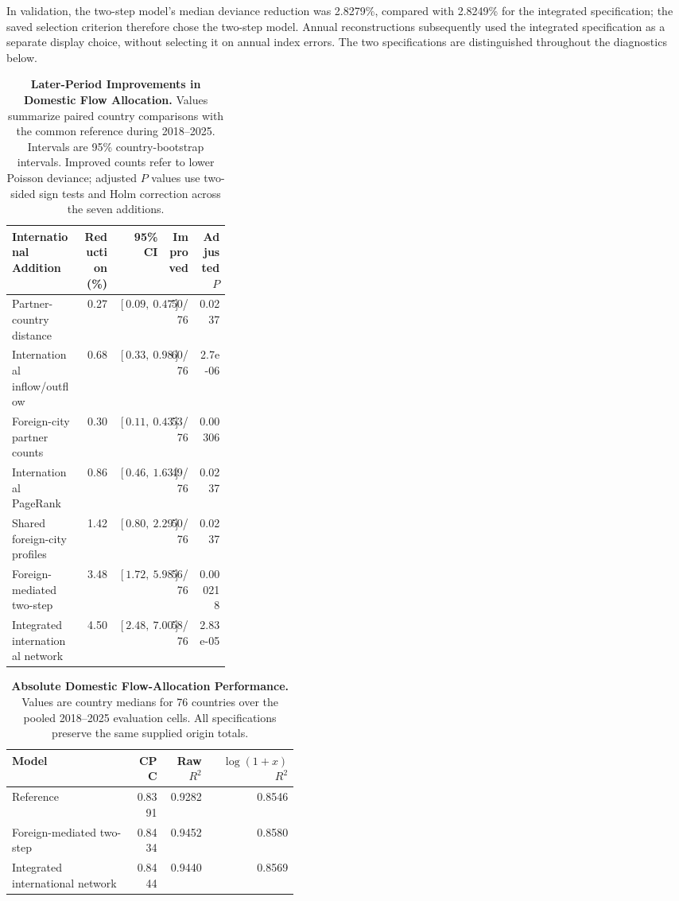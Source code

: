 In validation, the two-step model's median deviance reduction was 2.8279\%, compared with 2.8249\% for the integrated specification; the saved selection criterion therefore chose the two-step model. Annual reconstructions subsequently used the integrated specification as a separate display choice, without selecting it on annual index errors. The two specifications are distinguished throughout the diagnostics below.

\begin{table}[!htbp]
\centering
\caption{\textbf{Later-Period Improvements in Domestic Flow Allocation.} Values summarize paired country comparisons with the common reference during 2018--2025. Intervals are 95\% country-bootstrap intervals. Improved counts refer to lower Poisson deviance; adjusted $P$ values use two-sided sign tests and Holm correction across the seven additions.}
\label{tab:gravity_comparisons}
\small
\begin{tabular}{p{0.32\linewidth}rrrr}
\hline
International Addition & Reduction (\%) & 95\% CI & Improved & Adjusted $P$ \\
\hline
Partner-country distance & 0.27 & $[0.09,\ 0.47]$ & 50/76 & 0.0237 \\
International inflow/outflow & 0.68 & $[0.33,\ 0.98]$ & 60/76 & 2.7e-06 \\
Foreign-city partner counts & 0.30 & $[0.11,\ 0.43]$ & 53/76 & 0.00306 \\
International PageRank & 0.86 & $[0.46,\ 1.63]$ & 49/76 & 0.0237 \\
Shared foreign-city profiles & 1.42 & $[0.80,\ 2.29]$ & 50/76 & 0.0237 \\
Foreign-mediated two-step & 3.48 & $[1.72,\ 5.98]$ & 56/76 & 0.000218 \\
Integrated international network & 4.50 & $[2.48,\ 7.00]$ & 58/76 & 2.83e-05 \\
\hline
\end{tabular}
\end{table}
\FloatBarrier

\begin{table}[!htbp]
\centering
\caption{\textbf{Absolute Domestic Flow-Allocation Performance.} Values are country medians for 76 countries over the pooled 2018--2025 evaluation cells. All specifications preserve the same supplied origin totals.}
\label{tab:gravity_absolute}
\small
\begin{tabular}{p{0.42\linewidth}rrr}
\hline
Model & CPC & Raw $R^2$ & $\log(1+x)$ $R^2$ \\
\hline
Reference & 0.8391 & 0.9282 & 0.8546 \\
Foreign-mediated two-step & 0.8434 & 0.9452 & 0.8580 \\
Integrated international network & 0.8444 & 0.9440 & 0.8569 \\
\hline
\end{tabular}
\end{table}
\FloatBarrier

